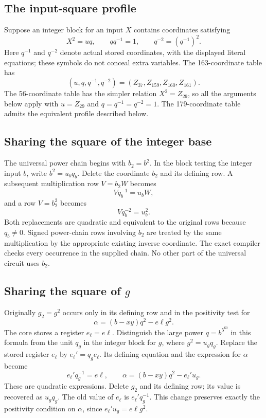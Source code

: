 \documentclass[11pt]{article}
\begin{document}
\subsection{The input-square profile}
Suppose an integer block for an input \(X\) contains coordinates satisfying
\begin{equation}\label{eq:square-profile}
 X^2=uq,\qquad qq^{-1}=1,\qquad q^{-2}=(q^{-1})^2.
\end{equation}
Here \(q^{-1}\) and \(q^{-2}\) denote actual stored coordinates, with the
displayed literal equations; these symbols do not conceal extra variables.
The 163-coordinate table has
\[
 (u,q,q^{-1},q^{-2})=(Z_{37},Z_{159},Z_{160},Z_{161}).
\]
The 56-coordinate table has the simpler relation \(X^2=Z_{29}\), so all
the arguments below apply with \(u=Z_{29}\) and \(q=q^{-1}=q^{-2}=1\).
The 179-coordinate table admits the equivalent profile described below.

\subsection{Sharing the square of the integer base}
The universal power chain begins with \(b_2=b^2\). In the block testing
the integer input \(b\), write \(b^2=u_bq_b\). Delete the coordinate
\(b_2\) and its defining row. A subsequent multiplication row
\(V=b_2W\) becomes
\[
                   Vq_b^{-1}=u_bW,
\]
and a row \(V=b_2^2\) becomes
\[
                   Vq_b^{-2}=u_b^2.
\]
Both replacements are quadratic and equivalent to the original rows because
\(q_b\ne0\). Signed power-chain rows involving \(b_2\) are treated by
the same multiplication by the appropriate existing inverse coordinate.
The exact compiler checks every occurrence in the supplied chain. No other
part of the universal circuit uses \(b_2\).

\subsection{Sharing the square of \(g\)}
Originally \(g_2=g^2\) occurs only in its defining row and in the positivity
test for
\[
                   \alpha=(b-xy)q^2-e\ell g^2.
\]
The core stores a register \(e_\ell=e\ell\). Distinguish the large power
\(q=b^{5^{60}}\) in this formula from the unit \(q_g\) in the integer
block for \(g\), where \(g^2=u_gq_g\).
Replace the stored register \(e_\ell\) by \(e_\ell'=q_g e_\ell\).
Its defining equation and the expression for \(\alpha\) become
\[
 e_\ell' q_g^{-1}=e\ell,
 \qquad \alpha=(b-xy)q^2-e_\ell'u_g.
\]
These are quadratic expressions. Delete \(g_2\) and its defining row;
its value is recovered as \(u_gq_g\). The old value of \(e_\ell\) is
\(e_\ell' q_g^{-1}\). This change preserves exactly the positivity
condition on \(\alpha\), since \(e_\ell'u_g=e\ell g^2\).
\end{document}
